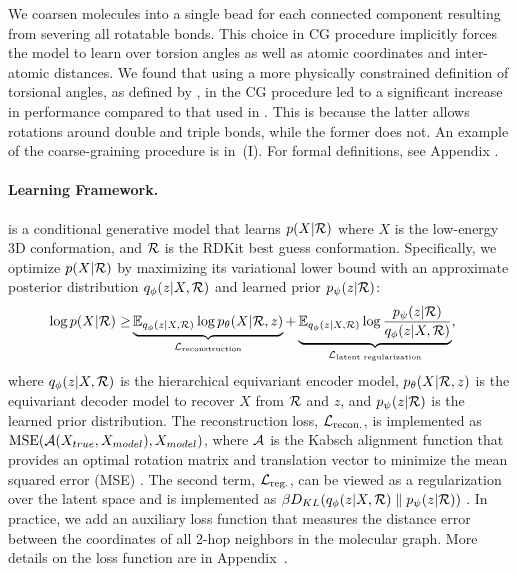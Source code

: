 We coarsen molecules into a single bead for each connected component resulting from severing all rotatable bonds.
This choice in CG procedure implicitly forces the model to learn over torsion angles as well as atomic coordinates and inter-atomic distances.
We found that using a more physically constrained definition of torsional angles, as defined by \citet{GeoMol}, in the CG procedure led to a significant increase in performance compared to that used in \citet{torsional-diffusion}. This is because the latter allows rotations around double and triple bonds, while the former does not. 
An example of the coarse-graining procedure is in~(I). For formal definitions, see Appendix .

\vspace{-1ex}
\paragraph{Learning Framework.} \model is a conditional generative model that learns $p(X | {\mathcal{R}})$ where $X$ is the low-energy 3D conformation, and ${\mathcal{R}}$ is the RDKit best guess conformation. Specifically, we optimize $p(X | {\mathcal{R}})$ by maximizing its variational lower bound with an approximate posterior distribution $q_\phi(z |X, {\mathcal{R}})$ and learned prior $p_\psi(z | {\mathcal{R}})$:
\begin{equation}
\begin{aligned}
    \log p(X|\gR) \geq & \underbrace{\E_{q_\phi(z | X, \gR)} \log p_\theta(X | \gR, z)}_{\gL_{\text{reconstruction}}} + \underbrace{\E_{q_\phi(z | X, \gR)} \log \frac{ p_\psi(z|\gR) }{q_\phi(z| X, \gR)}}_{\gL_{\text{latent regularization}}}, %
\label{eq:elbo}
\end{aligned}
\end{equation}
where $q_\phi(z|X,{\mathcal{R}})$ is the hierarchical equivariant encoder model, $p_\theta(X|{\mathcal{R}},z)$ is the equivariant decoder model to recover $X$ from ${\mathcal{R}}$ and $z$, and $p_\psi(z|{\mathcal{R}})$ is the learned prior distribution. The reconstruction loss, ${\mathcal{L}}_{\text{recon.}}$, is implemented as $\text{MSE}({\mathcal{A}}(X_{true}, X_{model}), X_{model})$, where ${\mathcal{A}}$ is the Kabsch alignment function that provides an optimal rotation matrix and translation vector to minimize the mean squared error (MSE) \citep{Kabsch}. The second term, ${\mathcal{L}}_{\text{reg.}}$, can be viewed as a regularization over the latent space and is implemented as $\beta D_{KL}(q_\phi(z | X, {\mathcal{R}})\parallel p_\psi(z|{\mathcal{R}}))$ \citep{beta-vae}. In practice, we add an auxiliary loss function that measures the distance error between the coordinates of all 2-hop neighbors in the molecular graph. More details on the loss function are in Appendix~.

